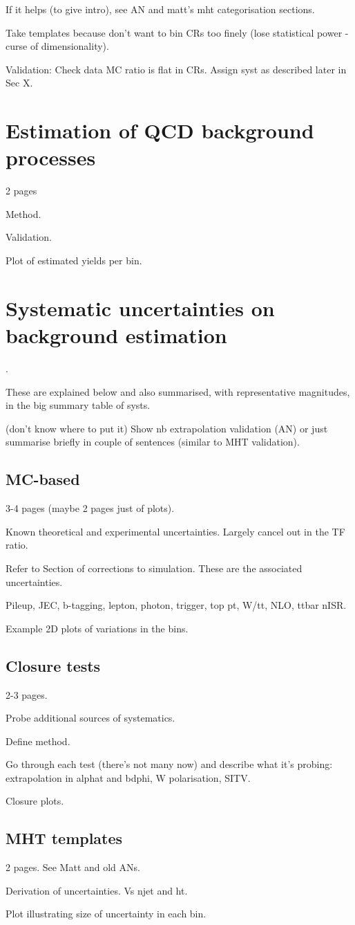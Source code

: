 If it helps (to give intro), see AN and matt's mht categorisation sections.

Take templates because don't want to bin CRs too finely (lose statistical power 
- curse of dimensionality).

Validation: Check data MC ratio is flat in CRs. Assign syst as described later 
in Sec X.

\section{Estimation of QCD background processes}
\label{sec:analysis-estimation-qcd}
2 pages

Method.

Validation.

Plot of estimated yields per bin.

\section{Systematic uncertainties on background estimation}
\label{sec:analysis-systematics}.

These are explained below and also summarised, with representative magnitudes, 
in the big summary table of systs.

(don't know where to put it)
Show nb extrapolation validation (AN) or just summarise briefly in couple of 
sentences (similar to MHT validation).

\subsection{MC-based}
3-4 pages (maybe 2 pages just of plots).

Known theoretical and experimental uncertainties.
Largely cancel out in the TF ratio.

Refer to Section of corrections to simulation. These are the associated 
uncertainties.

Pileup, JEC, b-tagging, lepton, photon, trigger, top pt, W/tt, NLO, ttbar nISR.

Example 2D plots of variations in the bins.

\subsection{Closure tests}
2-3 pages.

Probe additional sources of systematics.

Define method.

Go through each test (there's not many now) and describe what it's probing: 
extrapolation in alphat and bdphi, W polarisation, SITV.

Closure plots.

\subsection{MHT templates}
2 pages. See Matt and old ANs.

Derivation of uncertainties. Vs njet and ht.

Plot illustrating size of uncertainty in each bin.

